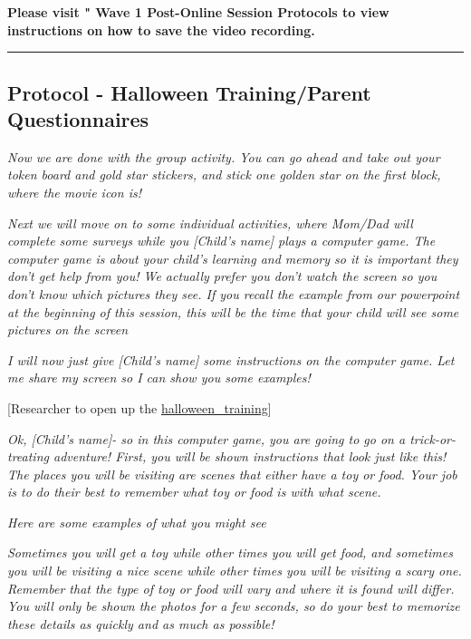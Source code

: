 \documentclass[]{book}
\begin{document}
\textbf{Please visit " Wave 1 Post-Online Session Protocols to view instructions on how to save the video recording.}

\begin{center}\rule{0.5\linewidth}{0.5pt}\end{center}

\hypertarget{protocol---halloween-trainingparent-questionnaires-2}{%
\subsection{Protocol - Halloween Training/Parent Questionnaires}\label{protocol---halloween-trainingparent-questionnaires-2}}

\emph{Now we are done with the group activity. You can go ahead and take out your token board and gold star stickers, and stick one golden star on the first block, where the movie icon is!}

\emph{Next we will move on to some individual activities, where Mom/Dad will complete some surveys while you {[}Child's name{]} plays a computer game. The computer game is about your child's learning and memory so it is important they don't get help from you! We actually prefer you don't watch the screen so you don't know which pictures they see. If you recall the example from our powerpoint at the beginning of this session, this will be the time that your child will see some pictures on the screen}

\emph{I will now just give {[}Child's name{]} some instructions on the computer game. Let me share my screen so I can show you some examples!}

{[}Researcher to open up the \href{https://ucla.app.box.com/file/709481066655}{halloween\_training}{]}

\emph{Ok, {[}Child's name{]}- so in this computer game, you are going to go on a trick-or-treating adventure! First, you will be shown instructions that look just like this! The places you will be visiting are scenes that either have a toy or food. Your job is to do their best to remember what toy or food is with what scene.}

\emph{Here are some examples of what you might see}

\emph{Sometimes you will get a toy while other times you will get food, and sometimes you will be visiting a nice scene while other times you will be visiting a scary one. Remember that the type of toy or food will vary and where it is found will differ. You will only be shown the photos for a few seconds, so do your best to memorize these details as quickly and as much as possible!}
\end{document}
